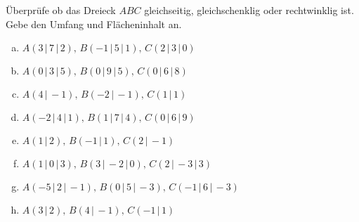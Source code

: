 \documentclass[a4paper,12pt]{article}
\newcommand{\Aufgabe}[2]{
	{
		\vspace*{0.3cm}
		\begin{tcolorbox}[breakable,colback=yellow!0,colframe=black!65!white,title=\textbf{Aufgabe #1:},width=\linewidth ]
			{#2}
		\end{tcolorbox}
		
		
	}
}
\begin{document}
	\Aufgabe{(Dreiecke)}{
		Überprüfe ob das Dreieck $ABC$ gleichseitig, gleichschenklig oder rechtwinklig ist.
		Gebe den Umfang und Flächeninhalt an.		
		\begin{enumerate}[(a)]
			\item $A( 3\,|\,7 \,|\,2 ),\, B( -1\,|\,5 \,|\,1 ),\,C(2 \,|\,3 \,|\,0 )$
			\item $A( 0\,|\,3 \,|\,5 ),\, B( 0\,|\,9 \,|\,5 ),\,C(0 \,|\,6 \,|\,8)$
			\item $A( 4\,|\,-1 ),\, B( -2\,|\,-1),\,C( 1\,|\,1)$
			\item $A( -2\,|\,4 \,|\,1 ),\, B( 1\,|\,7 \,|\,4 ),\,C( 0\,|\,6 \,|\,9 )$
			\item $A( 1 \,|\,2 ),\, B( -1\,|\,1),\,C( 2\,|\,-1)$
			\item $A( 1\,|\,0 \,|\,3 ),\, B( 3\,|\,-2 \,|\,0 ),\,C( 2\,|\, -3\,|\,3 )$
			\item $A( -5\,|\, 2\,|\,-1 ),\, B( 0\,|\, 5\,|\,-3 ),\,C(-1 \,|\,6 \,|\, -3)$
			\item $A( 3\,|\,2 ),\, B( 4\,|\,-1),\,C( -1\,|\,1)$
		\end{enumerate}
		
	}
	\newpage
\end{document}
